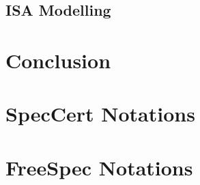 \documentclass[
11pt, %
english, %
singlespacing, %
headsepline, %
]{MastersDoctoralThesis} %
\begin{document}
\section{ISA Modelling}





\chapter{Conclusion}


\appendix %


\chapter{SpecCert Notations}

\chapter{FreeSpec Notations}

%
%
%


\printbibliography[heading=bibintoc]

\end{document}
